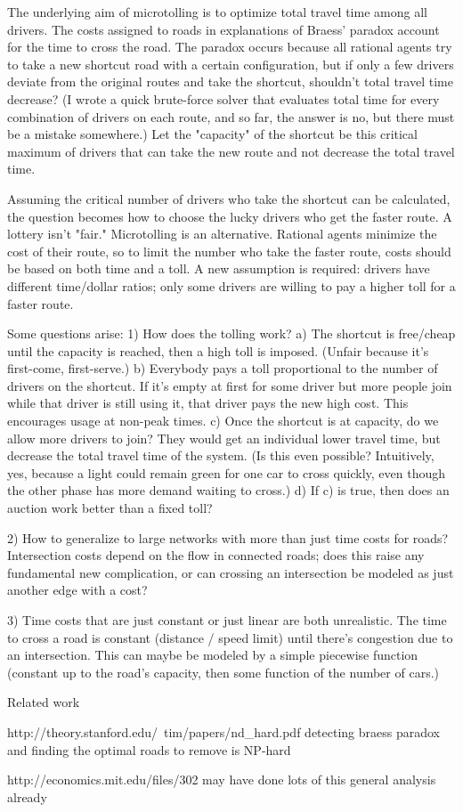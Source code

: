 The underlying aim of microtolling is to optimize total travel time among all
drivers. The costs assigned to roads in explanations of Braess' paradox account
for the time to cross the road. The paradox occurs because all rational agents
try to take a new shortcut road with a certain configuration, but if only a few
drivers deviate from the original routes and take the shortcut, shouldn't total
travel time decrease? (I wrote a quick brute-force solver that evaluates total
time for every combination of drivers on each route, and so far, the answer is
no, but there must be a mistake somewhere.) Let the "capacity" of the shortcut
be this critical maximum of drivers that can take the new route and not decrease
the total travel time.

Assuming the critical number of drivers who take the shortcut can be calculated,
the question becomes how to choose the lucky drivers who get the faster route.
A lottery isn't "fair." Microtolling is an alternative. Rational agents minimize
the cost of their route, so to limit the number who take the faster route, costs
should be based on both time and a toll. A new assumption is required: drivers
have different time/dollar ratios; only some drivers are willing to pay a higher
toll for a faster route.

Some questions arise:
1) How does the tolling work?
  a) The shortcut is free/cheap until the capacity is reached, then a high toll
     is imposed. (Unfair because it's first-come, first-serve.)
  b) Everybody pays a toll proportional to the number of drivers on the
     shortcut. If it's empty at first for some driver but more people join while
     that driver is still using it, that driver pays the new high cost. This
     encourages usage at non-peak times.
  c) Once the shortcut is at capacity, do we allow more drivers to join? They
     would get an individual lower travel time, but decrease the total travel
     time of the system. (Is this even possible? Intuitively, yes, because a
     light could remain green for one car to cross quickly, even though the
     other phase has more demand waiting to cross.)
  d) If c) is true, then does an auction work better than a fixed toll?

2) How to generalize to large networks with more than just time costs for roads?
   Intersection costs depend on the flow in connected roads; does this raise any
   fundamental new complication, or can crossing an intersection be modeled as
   just another edge with a cost?

3) Time costs that are just constant or just linear are both unrealistic. The
   time to cross a road is constant (distance / speed limit) until there's
   congestion due to an intersection. This can maybe be modeled by a simple
   piecewise function (constant up to the road's capacity, then some function of
   the number of cars.)


Related work

http://theory.stanford.edu/~tim/papers/nd_hard.pdf
detecting braess paradox and finding the optimal roads to remove is NP-hard

http://economics.mit.edu/files/302
may have done lots of this general analysis already
